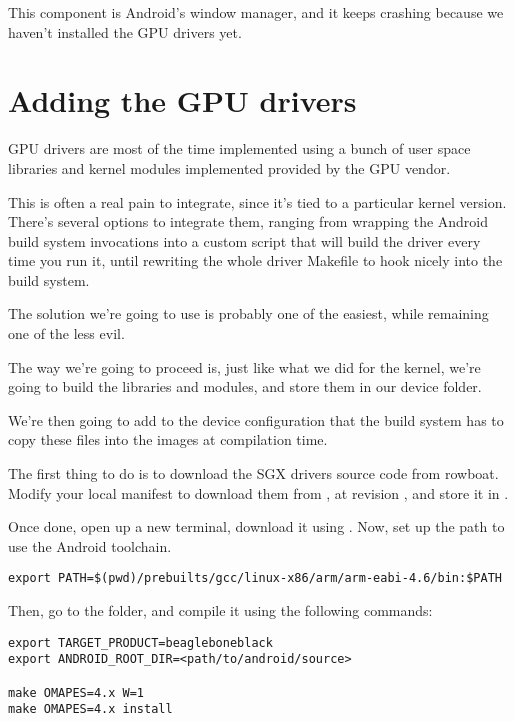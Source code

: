 This component is Android's window manager, and it keeps crashing
because we haven't installed the GPU drivers yet.

\section{Adding the GPU drivers}

GPU drivers are most of the time implemented using a bunch of
user space libraries and kernel modules implemented provided by the GPU
vendor.

This is often a real pain to integrate, since it's tied to a
particular kernel version. There's several options to integrate them,
ranging from wrapping the Android build system invocations into a
custom script that will build the driver every time you run it, until
rewriting the whole driver Makefile to hook nicely into the build
system.

The solution we're going to use is probably one of the easiest, while
remaining one of the less evil.

The way we're going to proceed is, just like what we did for the
kernel, we're going to build the libraries and modules, and store them
in our device folder.

We're then going to add to the device configuration that the build
system has to copy these files into the images at compilation time.

The first thing to do is to download the SGX drivers source code from
rowboat. Modify your local manifest to download them from
,
at revision , and store it in
.

Once done, open up a new terminal, download it using . Now,
set up the path to use the Android toolchain.

\begin{verbatim}
export PATH=$(pwd)/prebuilts/gcc/linux-x86/arm/arm-eabi-4.6/bin:$PATH
\end{verbatim}

Then, go to the  folder, and compile it using the following
commands:

\begin{verbatim}
export TARGET_PRODUCT=beagleboneblack
export ANDROID_ROOT_DIR=<path/to/android/source>

make OMAPES=4.x W=1
make OMAPES=4.x install
\end{verbatim}

